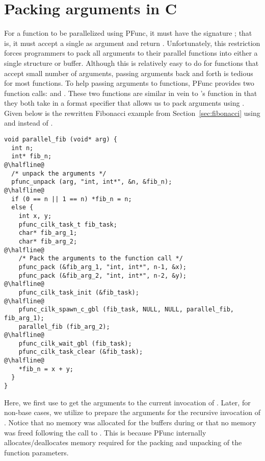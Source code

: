 \section{Packing arguments in C}
\label{sec:pack}
%
For a function to be parallelized using PFunc, it must have the signature
; that is, it must accept a single  as 
argument and return .
%
Unfortunately, this restriction forces programmers to pack all arguments to
their parallel functions into either a single structure or buffer. 
%
Although this is relatively easy to do for functions that accept small number
of arguments, passing arguments back and forth is tedious for most functions. 
%
To help passing arguments to functions, PFunc provides two function calls:
 and . 
%
These two functions are similar in vein to 's 
function in that they both take in a format specifier that allows us to pack
arguments using . 
%
Given below is the rewritten Fibonacci example from Section~\ref{sec:fibonacci}
using  and  instead of .
%
\begin{lstlisting}
void parallel_fib (void* arg) {
  int n;
  int* fib_n;
@\halfline@
  /* unpack the arguments */
  pfunc_unpack (arg, "int, int*", &n, &fib_n);
@\halfline@
  if (0 == n || 1 == n) *fib_n = n;
  else {
    int x, y;
    pfunc_cilk_task_t fib_task;
    char* fib_arg_1;
    char* fib_arg_2;
@\halfline@
    /* Pack the arguments to the function call */
    pfunc_pack (&fib_arg_1, "int, int*", n-1, &x);
    pfunc_pack (&fib_arg_2, "int, int*", n-2, &y);
@\halfline@
    pfunc_cilk_task_init (&fib_task);
@\halfline@
    pfunc_cilk_spawn_c_gbl (fib_task, NULL, NULL, parallel_fib, fib_arg_1);
    parallel_fib (fib_arg_2);
@\halfline@
    pfunc_cilk_wait_gbl (fib_task);
    pfunc_cilk_task_clear (&fib_task);
@\halfline@
    *fib_n = x + y;
  }
}
\end{lstlisting}
%
Here, we first use  to get the arguments to the 
current invocation of . 
%
Later, for non-base cases, we utilize  to prepare the
arguments for the recursive invocation of . 
%
Notice that no memory was allocated for the buffers during  or
that no memory was freed following the call to . 
%
This is because PFunc internally allocates/deallocates memory required for
the packing and unpacking of the function parameters. 


